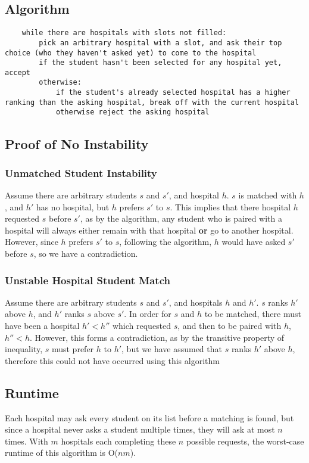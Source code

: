 \documentclass[titlepage]{article}
\numberwithin{equation}{subsection}
\begin{document}
\subsection{Algorithm}
\begin{minipage}{\linewidth}
    \begin{lstlisting}
    while there are hospitals with slots not filled:
        pick an arbitrary hospital with a slot, and ask their top choice (who they haven't asked yet) to come to the hospital
        if the student hasn't been selected for any hospital yet, accept
        otherwise:
            if the student's already selected hospital has a higher ranking than the asking hospital, break off with the current hospital
            otherwise reject the asking hospital
    \end{lstlisting}
\end{minipage}
\subsection{Proof of No Instability}
\subsubsection{Unmatched Student Instability}
Assume there are arbitrary students $s$ and $s'$, and hospital $h$. $s$ is matched with $h$, and $h'$ has
no hospital, but $h$ prefers $s'$ to $s$. This implies that there hospital $h$ requested $s$ before
$s'$, as by the algorithm, any student who is paired with a hospital will always either remain with
that hospital \textbf{or} go to another hospital. However, since $h$ prefers $s'$ to $s$, following
the algorithm, $h$ would have asked $s'$ before $s$, so we have a contradiction.
\subsubsection{Unstable Hospital Student Match}
Assume there are arbitrary students $s$ and $s'$, and hospitals $h$ and $h'$. $s$ ranks $h'$ above $h$, and
$h'$ ranks $s$ above $s'$. In order for $s$ and $h$ to be matched, there must have been a hospital $h' < h''$
which requested $s$, and then to be paired with $h$, $h'' < h$. However, this forms a contradiction, as by the
transitive property of inequality, $s$ must prefer $h$ to $h'$, but we have assumed that $s$ ranks $h'$ above $h$, 
therefore this could not have occurred using this algorithm
\subsection{Runtime}
Each hospital may ask every student on its list before a matching is found, but since a hospital never asks
a student multiple times, they will ask at most $n$ times. With $m$ hospitals each completing these $n$ possible
requests, the worst-case runtime of this algorithm is O($nm$).
\end{document}
